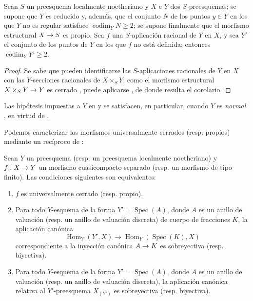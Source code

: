\documentclass[oneside,10pt]{amsart}
\makeatletter
\renewcommand{\geq}{\geqslant}
\newcommand{\ega@arrow}[2]{\mathchoice{#1}{#2}{#2}{#2}}
\renewcommand{\to}{\ega@arrow{\longrightarrow}{\rightarrow}}
\newcommand{\oldpage}[2][]{\marginnote{\normalfont\footnotesize\textbf{#1}~|~#2}\ignorespaces}
\let\EGAOriginalLabel\label
\renewcommand{\label}[1]{\phantomsection\EGAOriginalLabel{#1}}
\makeatother
\begin{document}
\begin{corollary}[7.3.6]
\label{II.7.3.6-fr}
Sean $S$ un preesquema localmente noetheriano y $X$ e $Y$ dos $S$-preesquemas;
se supone que $Y$ es reducido y, además, que el conjunto $N$ de los puntos $y\in Y$ en los que $Y$ no es regular satisface $\operatorname{codim}_YN\geq2$;
se supone finalmente que el morfismo estructural $X\to S$ es propio.
Sea $f$ una $S$-aplicación racional de $Y$ en $X$, y sea $Y'$ el conjunto de los puntos de $Y$ en los que $f$ no está definida;
entonces $\operatorname{codim}_YY'\geq2$.
\end{corollary}

\begin{proof}
Se sabe  que pueden identificarse las $S$-aplicaciones racionales de $Y$ en $X$ con las $Y$-secciones racionales de $X\times_SY$;
como el morfismo estructural $X\times_SY\to Y$ es cerrado , puede aplicarse , de donde resulta el corolario.
\end{proof}

\begin{remark}[7.3.7]
\label{II.7.3.7-fr}
Las hipótesis impuestas a $Y$ en  y  se satisfacen, en particular, cuando $Y$ es \emph{normal} , en virtud de .
\end{remark}


Podemos caracterizar los morfismos universalmente cerrados (resp. propios) mediante un recíproco de :

\begin{theorem}[7.3.8]
\label{II.7.3.8-fr}
Sean $Y$ un preesquema \textup{(resp.} un preesquema localmente noetheriano\textup{)} y $f:X\to Y$ un morfismo cuasicompacto separado \textup{(resp.} un morfismo de tipo finito\textup{)}.
Las condiciones siguientes son equivalentes:
\begin{enumerate}
  \item[\rm{(a)}] $f$ es universalmente cerrado \textup{(resp.} propio\textup{)}.
  \item[\rm{(b)}] Para todo $Y$-esquema de la forma $Y'=\operatorname{Spec}(A)$, donde $A$ es un anillo de valuación \textup{(resp.} un anillo de valuación discreta) de cuerpo de fracciones $K$, la aplicación canónica
  \[
\operatorname{Hom}_Y(Y',X)\longrightarrow
\operatorname{Hom}_Y(\operatorname{Spec}(K),X)
\]
  correspondiente a la inyección canónica $A\to K$ es sobreyectiva \textup{(resp.} biyectiva\textup{)}.
\oldpage[II]{145}
  \item[\rm{(c)}] Para todo $Y$-esquema de la forma $Y'=\operatorname{Spec}(A)$, donde $A$ es un anillo de valuación \textup{(resp.} un anillo de valuación discreta), la aplicación canónica  relativa al $Y'$-preesquema $X_{(Y')}$ es sobreyectiva \textup{(resp.} biyectiva).
\end{enumerate}
\end{theorem}
\end{document}
